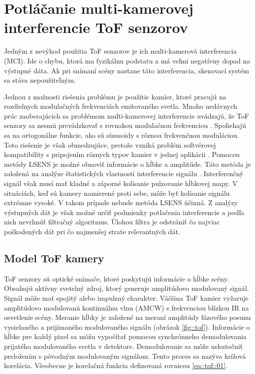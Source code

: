 \chapter{Potláčanie multi-kamerovej interferencie ToF senzorov} 
\label{kap:interference}
\pagestyle{fancy}
\fancyhf{}
\fancyfoot[CE,CO]{\thepage}
\renewcommand{\footrulewidth}{1pt}

Jedným z nevýhod použitia ToF senzorov je ich multi-kamerová interferencia (MCI). Ide o chybu, ktorá ma fyzikálnu podstatu a má veľmi negatívny dopad na výstupné dáta. Ak pri snímaní scény nastane táto interferencia, skenovací systém sa stáva nepoužiteľným. 

Jednou z možnosti riešenia problému je použitie kamier, ktoré pracujú na rozdielnych modulačných frekvenciách emitovaného svetla. Mnoho nedávnych prác zaoberajúcich sa problémom multi-kamerovej interferencie  uvádzajú, že ToF senzory sa nesmú prevádzkovať s rovnakou modulačnou frekvenciou \cite{Kim}. Spoliehajú sa na ortogonálne funkcie, ako sú sínusoidy s rôznou frekvenčnou moduláciou. Toto riešenie je však obmedzujúce, pretože vzniká problém softvérovej kompatibility s pripojením rôznych typov kamier v jednej aplikácii \cite{Buttgen, Whyte, Seitz}.
Pomocou metódy LSENS je možné obnoviť informácie o hĺbke a amplitúde. Táto metóda je založená na analýze štatistických vlastností interferencie signálu \cite{Lianhua}. Interferenčný signál však musí mať kladné a záporné kolísanie pulzovanie hĺbkovej mapy. V situáciách, keď sú kamery namierené proti sebe, môže byť kolísanie signálu extrémne vysoké. V takom prípade nebude metóda LSENS účinná. Z analýzy výstupných dát je však možné určiť podmienky potlačenia interferencie a podľa nich nevrhnúť filtračný algoritmus. Úlohou filtra je odstrániť čo najviac poškodených dát pri čo najmenšej strate relevantných dát.    


\section{Model ToF kamery}

ToF senzory sú optické snímače, ktoré poskytujú informácie o hĺbke scény. Obsahujú aktívny svetelný zdroj, ktorý generuje amplitúdovo modulovaný signál. Signál môže mať spojitý alebo impulzný charakter. Väčšina ToF kamier vyžaruje amplitúdovo modulovanú kontinuálnu vlnu (AMCW) s frekvenciou blízkou IR na osvetlenie scény. Meranie hĺbky je založené na meraní amplitúdy fázového posunu vysielaného a prijímaného modulovaného signálu (obrázok \ref{fig::tof}). Informácie o hĺbke pre každý pixel sa môžu vypočítať pomocou synchrónneho demodulovania prijatého modulovaného svetla v detektore. Demodulovanie sa môže uskutočniť preložením s pôvodným modulovaným signálom. Tento proces sa nazýva krížová korelácia. Všeobecne je korelačná funkcia definovaná rovnicou \ref{eq::tof::01}.

